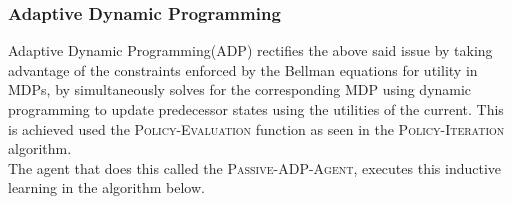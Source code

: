 \documentclass[11pt]{article}
\begin{document}
\subsubsection{Adaptive Dynamic Programming}

Adaptive Dynamic Programming(ADP) rectifies the above said issue by taking advantage of the constraints enforced by the Bellman equations for utility in MDPs, by simultaneously solves for the corresponding MDP using dynamic programming to update predecessor states using the utilities of the current. This is achieved used the \textsc{Policy-Evaluation} function as seen in the \textsc{Policy-Iteration} algorithm.\\

The agent that does this called the \textsc{Passive-ADP-Agent}, executes this inductive learning in the algorithm below.
\end{document}
